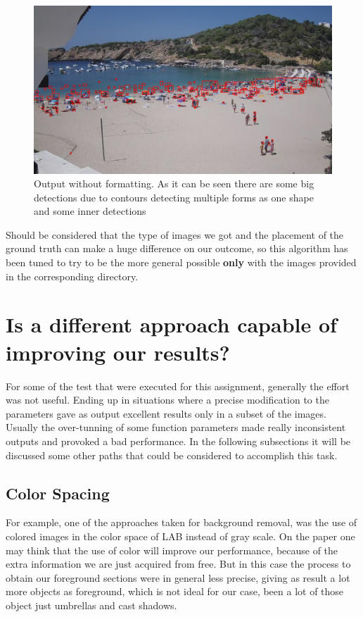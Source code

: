 \documentclass[10pt]{article}
\begin{document}
\begin{figure}[h]
  \centering
  \includegraphics[width=\textwidth]{img/det_name.jpg}
  \caption{Output without formatting. As it can be seen there are some big detections due to contours detecting multiple forms as one shape and some inner detections}
  \label{fig:detections}
\end{figure}

\FloatBarrier

Should be considered that the type of images we got and the placement of the ground truth can make a huge difference on our outcome, so this algorithm has been tuned to try to be the more general possible \textbf{only} with the images provided in the corresponding directory.

\section{Is a different approach capable of improving our results?}

For some of the test that were executed for this assignment, generally the effort was not useful. Ending up in situations where a precise modification to the parameters gave as output excellent results only in a subset of the images. Usually the over-tunning of some function parameters made really inconsistent outputs and provoked a bad performance. In the following subsections it will be discussed some other paths that could be considered to accomplish this task.

\subsection*{Color Spacing}
For example, one of the approaches taken for background removal, was the use of colored images in the color space of LAB  instead of gray scale. On the paper one may think that the use of color will improve our performance, because of the extra information we are just acquired from free. But in this case the process to obtain our foreground sections were in general less precise, giving as result a lot more objects as foreground, which is not ideal for our case, been a lot of those object just umbrellas and cast shadows.
\end{document}
